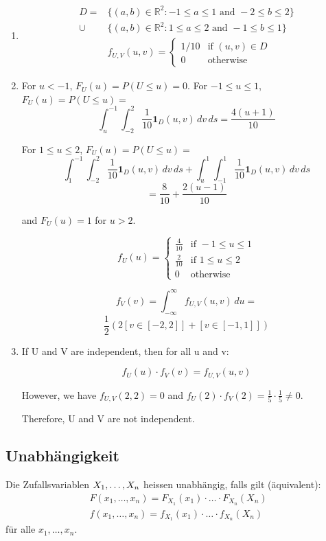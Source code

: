 \begin{enumerate}[noitemsep,topsep=0pt,parsep=0pt,partopsep=0pt]  
  \item 
\begin{align*}
  D =  & \{(a, b) \in \mathbb{R}^2 : -1 \leq a \leq 1 \text{ and } -2 \leq b \leq 2\} \\
  \cup & \{(a, b) \in \mathbb{R}^2 : 1 \leq a \leq 2 \text{ and } -1 \leq b \leq 1\}  \\
       & f_{U,V}(u, v) =
  \begin{cases}
    1/10 & \text{if } (u, v) \in D \\
    0    & \text{otherwise}
  \end{cases}
\end{align*}
\item For $u < -1$, $F_U(u) = P(U \leq u) = 0$.
For $-1 \leq u \leq 1$, $F_U(u) = P(U \leq u) = $
\[
  \int_u^{-1} \int_{-2}^{2} \frac{1}{10} \mathbf{1}_D(u, v) \, dv \, ds = \frac{4(u + 1)}{10}
\]

For $1 \leq u \leq 2$, $F_U(u) = P(U \leq u) =$
\[
  \int_1^{-1} \int_{-2}^{2} \frac{1}{10} \mathbf{1}_D(u, v) \, dv \, ds + \int_u^1 \int_{-1}^{1} \frac{1}{10} \mathbf{1}_D(u, v) \, dv \, ds
\]
\[
  = \frac{8}{10} + \frac{2(u - 1)}{10}
\]

and $F_U(u) = 1$ for $u > 2$.

\[
  f_U(u) = \begin{cases}
    \frac{4}{10} & \text{if } -1 \leq u \leq 1 \\
    \frac{2}{10} & \text{if } 1 \leq u \leq 2  \\
    0            & \text{otherwise}
  \end{cases}
\]

\[
  f_V(v) = \int_{-\infty}^{\infty} f_{U,V}(u,v) \, du =
\]
\[
  \frac{1}{2}\left(2[v \in [-2,2]] + [v \in [-1,1]]\right)
\]

\item If U and V are independent, then for all u and v:

\[
  f_U(u) \cdot f_V(v) = f_{U,V}(u,v)
\]

However, we have \(f_{U,V}(2,2) = 0\) and \(f_U(2) \cdot f_V(2) = \frac{1}{5}
\cdot \frac{1}{5} \neq 0\).

Therefore, U and V are not independent.
\end{enumerate}
\BoxEnd{}
\subsection*{Unabhängigkeit}
Die Zufallsvariablen $X_1, \dots, X_n$ heissen unabhängig, falls gilt
(äquivalent):
\begin{align*}
  F (x_1, \dots, x_n) = F_{X_1} (x_1) \cdot \hdots \cdot F_{X_n} (X_n) \\
  f (x_1, \dots, x_n) = f_{X_1} (x_1) \cdot \hdots \cdot f_{X_n} (X_n)
\end{align*}
für alle $x_1, \dots, x_n$.
